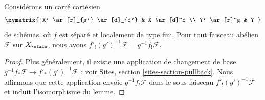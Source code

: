 \begin{lemma}
\label{lemma-base-change-f-shriek-separated}
Considérons un carré cartésien
$$
\xymatrix{
X' \ar[r]_{g'} \ar[d]_{f'} & X \ar[d]^f \\
Y' \ar[r]^g & Y
}
$$
de schémas, où $f$ est séparé et localement de type fini.
Pour tout faisceau abélien $\mathcal{F}$ sur $X_\etale$, nous avons
$f'_!(g')^{-1}\mathcal{F} = g^{-1}f_!\mathcal{F}$.
\end{lemma}

\begin{proof}
Plus généralement, il existe une application de changement de base
$g^{-1}f_*\mathcal{F} \to f'_*(g')^{-1}\mathcal{F}$ ; voir
Sites, section \ref{sites-section-pullback}.
Nous affirmons que cette application envoie $g^{-1}f_!\mathcal{F}$
dans le sous-faisceau $f'_!(g')^{-1}\mathcal{F}$
et induit l'isomorphisme du lemme.


\end{proof}
